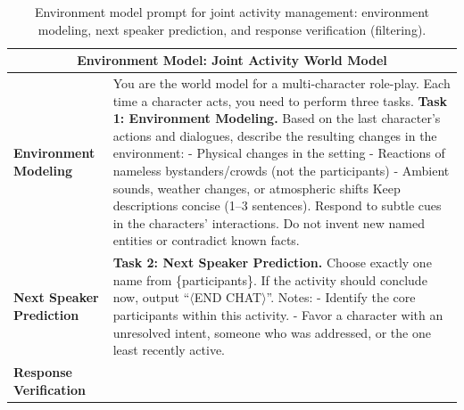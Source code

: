 \begin{table}[h]
\centering
\caption{Environment model prompt for joint activity management: environment modeling, next speaker prediction, and response verification (filtering).}
\label{tab:prompts_god_joint}
\begin{tabular}{p{0.8in}p{4.3in}}
\toprule
\multicolumn{2}{c}{\textbf{Environment Model: Joint Activity World Model}} \\
\midrule

\textbf{Environment \newline Modeling} &

You are the world model for a multi-character role-play. Each time a character acts, you need to perform three tasks.
\vspace{4pt}\newline
\textbf{Task 1: Environment Modeling.} Based on the last character's actions and dialogues, describe the resulting changes in the environment:
\newline - Physical changes in the setting
\newline - Reactions of nameless bystanders/crowds (not the participants)
\newline - Ambient sounds, weather changes, or atmospheric shifts
\vspace{3pt}\newline
Keep descriptions concise (1--3 sentences). Respond to subtle cues in the characters' interactions. Do not invent new named entities or contradict known facts.

\\
\midrule

\textbf{Next Speaker \newline Prediction} &

\textbf{Task 2: Next Speaker Prediction.} Choose exactly one name from \{participants\}. If the activity should conclude now, output ``$\langle$END CHAT$\rangle$''.
\vspace{3pt}\newline
Notes:
\newline - Identify the core participants within this activity.
\newline - Favor a character with an unresolved intent, someone who was addressed, or the one least recently active.

\\
\midrule

\textbf{Response \newline Verification} &


\end{tabular}
\end{table}
